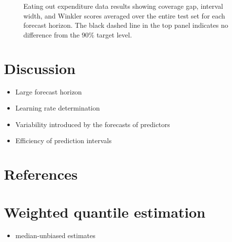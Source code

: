 \documentclass[
  11pt,
  a4paper,
]{article}
\providecommand{\tightlist}{%
  \setlength{\itemsep}{0pt}\setlength{\parskip}{0pt}}\usepackage{longtable,booktabs,array}
\theoremstyle{plain}
\theoremstyle{plain}
\theoremstyle{remark}
\begin{document}
\begin{figure}


\caption{\label{fig-cafe_result}Eating out expenditure data results
showing coverage gap, interval width, and Winkler scores averaged over
the entire test set for each forecast horizon. The black dashed line in
the top panel indicates no difference from the \(90\%\) target level.}

\end{figure}%

\section{Discussion}\label{discussion}

\begin{itemize}
\item
  Large forecast horizon
\item
  Learning rate determination
\item
  Variability introduced by the forecasts of predictors
\item
  Efficiency of prediction intervals
\end{itemize}

\section*{References}\label{references}

\printbibliography[heading=none]

\newpage
\appendix
\setcounter{section}{0}
\renewcommand{\thesection}{Appendix \Alph{section}}
\renewcommand{\thesubsection}{\Alph{section}.\arabic{subsection}}
\renewcommand{\thefigure}{A\arabic{figure}}
\renewcommand{\thetable}{A\arabic{table}}
\setcounter{figure}{0}
\setcounter{table}{0}

\section{Weighted quantile estimation}\label{sec-wq}

\begin{itemize}
\tightlist
\item
  median-unbiased estimates
\end{itemize}
\end{document}
